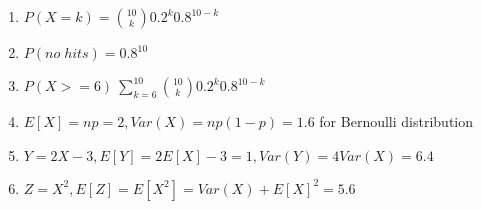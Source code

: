 \documentclass[../../probability-notes.tex]{subfile}
\begin{document}
        \begin{enumerate}
            \item $P(X=k) = \binom{10}{k} 0.2^{k}0.8^{10-k}$
            \item $P(no\;hits) = 0.8^{10}$
            \item $P(X>=6) \ \sum_{k=6}^{10} \binom{10}{k} 0.2^{k}0.8^{10-k}$
            \item $E[X] = np = 2, Var(X) = np(1-p) = 1.6$ for Bernoulli distribution
            \item $Y = 2X - 3, E[Y] = 2E[X] - 3 = 1, Var(Y) = 4Var(X) = 6.4$
            \item $Z = X^{2}, E[Z] = E[X^{2}] = Var(X) + E[X]^{2} = 5.6$
        \end{enumerate}
\end{document}
